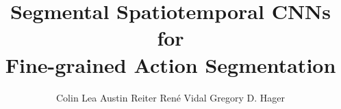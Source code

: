 \documentclass[runningheads]{llncs}
\begin{document}
	
\pagestyle{headings}
\mainmatter
\def\ECCV16SubNumber{473}  

\title{Segmental Spatiotemporal CNNs for\\ Fine-grained Action Segmentation}







\author{Colin Lea \hspace{11px} Austin Reiter \hspace{11px} Ren\'{e} Vidal \hspace{11px} Gregory D. Hager}






\maketitle
\end{document}
